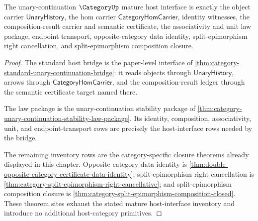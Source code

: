 \begin{theorem}
\label{thm:categoryup-mature-host-interface-inventory}
The unary-continuation $\CategoryUp$ mature host interface is exactly the object
carrier $\mathsf{UnaryHistory}$, the hom carrier
$\mathsf{CategoryHomCarrier}$, identity witnesses, the composition-result
carrier and semantic certificate, the associativity and unit law package,
endpoint transport, opposite-category data identity, split-epimorphism right
cancellation, and split-epimorphism composition closure.
\end{theorem}
\begin{proof}
The standard host bridge is the paper-level interface of
\autoref{thm:category-standard-unary-continuation-bridge}: it reads objects
through $\mathsf{UnaryHistory}$, arrows through
$\mathsf{CategoryHomCarrier}$, and the composition-result ledger through the
semantic certificate target named there.

The law package is the unary-continuation stability package of
\autoref{thm:category-unary-continuation-stability-law-package}. Its identity,
composition, associativity, unit, and endpoint-transport rows are precisely the
host-interface rows needed by the bridge.

The remaining inventory rows are the category-specific closure theorems already
displayed in this chapter. Opposite-category data identity is
\autoref{thm:double-opposite-category-certificate-data-identity};
split-epimorphism right cancellation is
\autoref{thm:category-split-epimorphism-right-cancellative}; and
split-epimorphism composition closure is
\autoref{thm:category-split-epimorphism-composition-closed}. These theorem
sites exhaust the stated mature host-interface inventory and introduce no
additional host-category primitives.
\end{proof}

